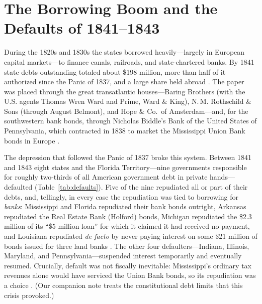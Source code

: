 \documentclass[12pt]{article}
\begin{document}
\section{The Borrowing Boom and the Defaults of 1841--1843}
\label{sec:defaults}

During the 1820s and 1830s the states borrowed heavily---largely in European
capital markets---to finance canals, railroads, and state-chartered banks. By 1841
state debts outstanding totaled about \$198 million, more than half of it
authorized since the Panic of 1837, and a large share held abroad
\citep{wallis2004sovereign, kimwallis2005market}. The paper was placed through the
great transatlantic houses---Baring Brothers (with the U.S. agents Thomas Wren Ward
and Prime, Ward \& King), N.\,M. Rothschild \& Sons (through August Belmont), and
Hope \& Co.\ of Amsterdam---and, for the southwestern bank bonds, through Nicholas
Biddle's Bank of the United States of Pennsylvania, which contracted in 1838 to
market the Mississippi Union Bank bonds in Europe \citep{wallis2004sovereign}.

The depression that followed the Panic of 1837 broke this system. Between 1841 and
1843 eight states and the Florida Territory---nine governments responsible for
roughly two-thirds of all American government debt in private hands---defaulted
(Table~\ref{tab:defaults}). Five of the nine repudiated all or part of their
debts, and, tellingly, in every case the repudiation was tied to borrowing for
\emph{banks}: Mississippi and Florida repudiated their bank bonds outright,
Arkansas repudiated the Real Estate Bank (Holford) bonds, Michigan repudiated the
\$2.3 million of its ``\$5 million loan'' for which it claimed it had received no
payment, and Louisiana repudiated \emph{de facto} by never paying interest on some
\$21 million of bonds issued for three land banks \citep{wallis2004sovereign,
english1996understanding}. The other four defaulters---Indiana, Illinois, Maryland,
and Pennsylvania---suspended interest temporarily and eventually resumed. Crucially,
default was not fiscally inevitable: Mississippi's ordinary tax revenues alone would
have serviced the Union Bank bonds, so its repudiation was a choice
\citep{wallis2004sovereign}. (Our companion note treats the constitutional debt
limits that this crisis provoked.)
\end{document}
